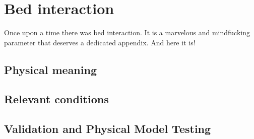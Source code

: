 \chapter{Bed interaction}
\label{apx:bedinteraction}

Once upon a time there was bed interaction. It is a marvelous and
mindfucking parameter that deserves a dedicated appendix. And here it
is!

\section{Physical meaning}

\section{Relevant conditions}

\section{Validation and Physical Model Testing}

